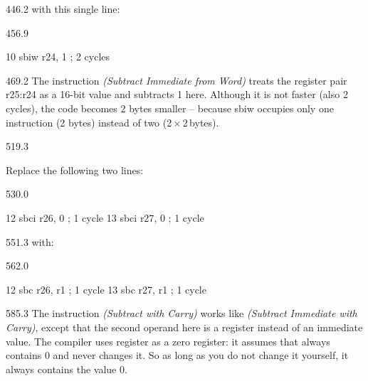 \documentclass{aslab}
\makeatletter
\newcommand*\aN[1]{\textcolor{codeorange}{#1}}%
\newcommand*\aI[1]{\textcolor{codegreen}{#1}}%
\newcommand*\aK[1]{\textcolor{codered}{#1}}%
\newcommand*\aR[1]{\textcolor{codecyan}{#1}}%
\newcommand*\aC[1]{\textcolor{codepurple}{#1}}%
\newenvironment{asmlisting}[1][11]{\par
  \edef\asm@bs{\the\baselineskip}\fontsize{#1bp}{\asm@bs}\selectfont
  \ttfamily\asm@setup}{\par}
\makeatother
\begin{document}
\begin{region}[x=74.7,right=0]{446.2}
with this single line:
\end{region}

\begin{region}[x=74.7,right=0]{456.9}
\begin{asmlisting}[9]
\aN{10}         \aI{sbiw}    \aR{r24},    \aK{1}           \aC{; 2 cycles}
\end{asmlisting}
\end{region}

\begin{region}[x=74.7,right=0,pitch=12.03]{469.2}
The instruction  \textit{(Subtract Immediate from Word)} treats
the register pair r25:r24 as a 16-bit value and subtracts 1 here. Although
it is not faster (also 2 cycles), the code becomes 2 bytes smaller --
because sbiw occupies only one instruction (2 bytes) instead of two
(2\,×\,2\,bytes).
\end{region}

\begin{region}{519.3}
\begin{numlist}[start=2]
\item Replace the following two lines:
\end{numlist}
\end{region}

\begin{region}[x=74.7,right=0,pitch=10]{530.0}
\begin{asmlisting}[9]
\aN{12}         \aI{sbci}    \aR{r26},    \aK{0}           \aC{; 1 cycle}
\aN{13}         \aI{sbci}    \aR{r27},    \aK{0}           \aC{; 1 cycle}
\end{asmlisting}
\end{region}

\begin{region}[x=74.7,right=0]{551.3}
with:
\end{region}

\begin{region}[x=74.7,right=0,pitch=10.8]{562.0}
\begin{asmlisting}[9]
\aN{12}         \aI{sbc}     \aR{r26},    \aR{r1}          \aC{; 1 cycle}
\aN{13}         \aI{sbc}     \aR{r27},    \aR{r1}          \aC{; 1 cycle}
\end{asmlisting}
\end{region}

\begin{region}[x=74.7,right=0,pitch=12.47]{585.3}
The instruction  \textit{(Subtract with Carry)} works like
 \textit{(Subtract Immediate with Carry)}, except that the second
operand here is a register instead of an immediate value. The compiler uses
register  as a zero register: it assumes that  always
contains 0 and never changes it. So as long as you do not change it
yourself, it always contains the value 0.
\end{region}
\end{document}

